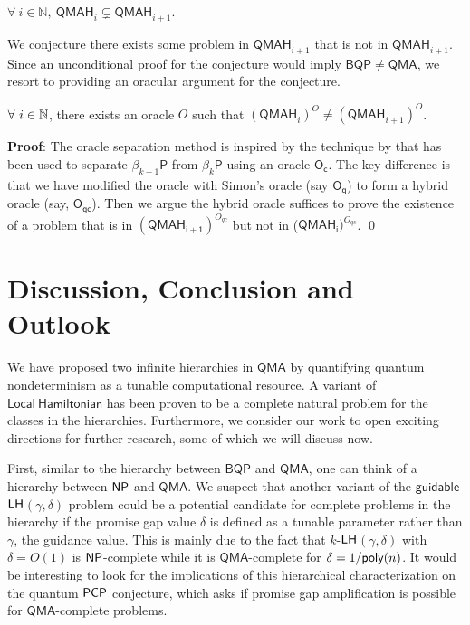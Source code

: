 \documentclass[11pt]{article}
\newcommand{\ms}[1]{\mathsf{#1}}
\begin{document}
\begin{conj}
    $\forall\ i\in \mathbb{N},\  \ms{QMAH}_i \subsetneq \ms{QMAH}_{i+1}.$
\end{conj}
We conjecture there exists some problem in $\ms{QMAH}_{i+1}$ that is not in $\ms{QMAH}_{i+1}$. Since an unconditional proof for the conjecture would imply $\ms{BQP} \neq \ms{QMA}$, we resort to providing an oracular argument for the conjecture.
\begin{theorem}
    $\forall\ i\in \mathbb{N}$, there exists an oracle $O$ such that $(\ms{QMAH}_i)^O \neq (\ms{QMAH}_{i+1})^O $.
\end{theorem}
\textbf{Proof}: The oracle separation method is inspired by the technique by \cite{Kintala1980-yv} that has been used to separate $\beta_{k+1}\mathsf{P}$ from $\beta_k\mathsf{P}$ using an oracle $\mathsf{O_c}$. The key difference is that we have modified the oracle with Simon's oracle (say $\mathsf{O_q}$) to form a hybrid oracle (say, $\mathsf{O_{qc}}$). Then we argue the hybrid oracle suffices to prove the existence of a problem that is in  $(\ms{QMAH_{i+1}})^{O_{qc}}$ but not in ($\ms{QMAH_{i}})^{O_{qc}}$. \qed


\section{Discussion, Conclusion and Outlook}
We have proposed two infinite hierarchies in $\mathsf{QMA}$ by quantifying quantum nondeterminism as a tunable computational resource. A variant of $\mathsf{Local\ Hamiltonian}$ has been proven to be a complete natural problem for the classes in the hierarchies. Furthermore, we consider our work to open exciting directions for further research, some of which we will discuss now.\par

First, similar to the hierarchy between $\mathsf{BQP}$ and $\mathsf{QMA}$, one can think of a hierarchy between  $\mathsf{NP}$  and $\mathsf{QMA}$. We suspect that another variant of the $\mathsf{guidable}$ $\mathsf{LH}$$(\gamma, \delta)$ problem could be a potential candidate for complete problems in the hierarchy if the promise gap value $\delta$ is defined as a tunable parameter rather than $\gamma$, the guidance value. This is mainly due to the fact that $k$-$\mathsf{LH}$$(\gamma, \delta)$ with $\delta=O(1)$ is  $\mathsf{NP}$-complete while it is $\mathsf{QMA}$-complete for $\delta=1/\mathsf{poly}(n)$. It would be interesting to look for the implications of this hierarchical characterization on the quantum $\mathsf{PCP}$ conjecture, which asks if promise gap amplification is possible for $\mathsf{QMA}$-complete problems.
\par
\end{document}
